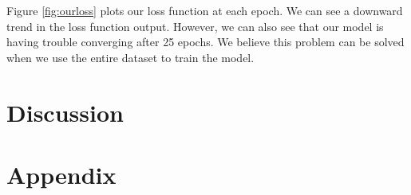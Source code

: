 \documentclass{article}
\begin{document}
Figure \ref{fig:ourloss} plots our loss function at each epoch. We can
see a downward trend in the loss function output. However, we can also
see that our model is having trouble converging after 25 epochs. We believe
this problem can be solved when we use the entire dataset to train the model.

\section{Discussion}


\section{Appendix}



\end{document}
